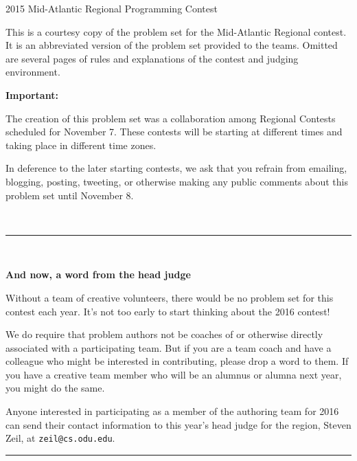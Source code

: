 \documentclass[12pt,letterpaper]{article}
\begin{document}
{\sffamily
\bfseries
\Large 
\begin{center}
\protect\rule{0pt}{1.1em}2015 Mid-Atlantic Regional Programming Contest
\end{center}
}


This is a courtesy copy of the problem set for the
Mid-Atlantic Regional contest.  It is an abbreviated version of the
problem set provided to the teams. Omitted are several pages of rules
and explanations of the contest and judging environment.


\begin{center}
{\large\bf Important:} 
\end{center}

The creation of this problem set was a collaboration
among Regional Contests scheduled for November 7. These
contests will be starting at different times and taking place in
different time zones.

In deference to the later starting contests, we ask that you refrain
from emailing, blogging, posting, tweeting, or otherwise making any public
comments about this problem set until November 8.

~

\hrule

~

\textbf{And now, a word from the head judge}

Without a team of creative volunteers, there would be no problem set
for this contest each year.  It's not too early to start thinking
about the 2016 contest!

We do require that problem authors not be coaches of or otherwise
directly associated with a participating team. But if you are a team
coach and have a colleague who might be interested in contributing,
please drop a word to them. If you have a creative team member who
will be an alumnus or alumna next year, you might do the same.

Anyone interested in participating as a member of the authoring team
for 2016 can send their contact information to this year's head judge
for the region, Steven Zeil, at \texttt{zeil@cs.odu.edu}.

\hrule

~





\end{document}

